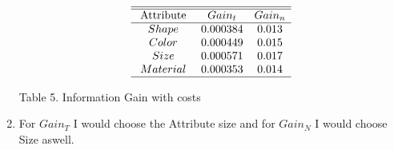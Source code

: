 \documentclass[11pt]{article}
\begin{document}
\begin{enumerate}
		\begin{align}
			\begin{array}{ccc}
				\hline \hline \text { Attribute } & \mathnormal{Gain_t}& \mathnormal{Gain_n} \\
				\hline 
				Shape & 0.000384 & 0.013\\
				Color & 0.000449 & 0.015\\
				Size & 0.000571 & 0.017\\
				Material & 0.000353 & 0.014\\
				\hline
			\end{array}
		\end{align}
		\begin{center} Table 5. Information Gain with costs  \end{center}
		\item For $Gain_T$ I would choose the Attribute size  and for $Gain_N$ I would choose Size aswell.
	\end{enumerate}
	
\end{document}
